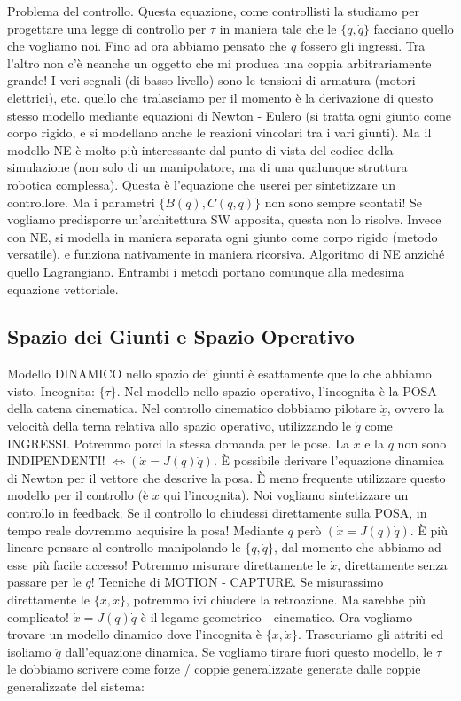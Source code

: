 Problema del controllo. Questa equazione, come controllisti la studiamo per progettare una legge di controllo per $\tau$ in maniera tale che le $\{q,\dot{q}\}$ facciano quello che vogliamo noi. Fino ad ora abbiamo pensato che $\dot{q}$ fossero gli ingressi. Tra l'altro non c'è neanche un oggetto che mi produca una coppia arbitrariamente grande! I veri segnali (di basso livello) sono le tensioni di armatura (motori elettrici), etc. quello che tralasciamo per il momento è la derivazione di questo stesso modello mediante equazioni di Newton - Eulero (si tratta ogni giunto come corpo rigido, e si modellano anche le reazioni vincolari tra i vari giunti). Ma il modello NE è molto più interessante dal punto di vista del codice della simulazione (non solo di un manipolatore, ma di una qualunque struttura robotica complessa). Questa è l'equazione che userei per sintetizzare un controllore. Ma i parametri $\{B(q),C(q,\dot{q})\}$ non sono sempre scontati! Se vogliamo predisporre un'architettura SW apposita, questa non lo risolve. Invece con NE, si modella in maniera separata ogni giunto come corpo rigido (metodo versatile), e funziona nativamente in maniera ricorsiva. Algoritmo di NE anziché quello Lagrangiano. Entrambi i metodi portano comunque alla medesima equazione vettoriale.

\subsection{Spazio dei Giunti e Spazio Operativo}

Modello DINAMICO nello spazio dei giunti è esattamente quello che abbiamo visto. Incognita: $\{\tau\}$. Nel modello nello spazio operativo, l'incognita è la POSA della catena cinematica. Nel controllo cinematico dobbiamo pilotare $\underline{\dot{x}}$, ovvero la velocità della terna relativa allo spazio operativo, utilizzando le $\dot{q}$ come INGRESSI. Potremmo porci la stessa domanda per le pose. La $x$ e la $q$ non sono INDIPENDENTI! $\iff(\dot{x}=J(q)\dot{q})$. \`E possibile derivare l'equazione dinamica di Newton per il vettore che descrive la posa. \`E meno frequente utilizzare questo modello per il controllo (è $x$ qui l'incognita). Noi vogliamo sintetizzare un controllo in feedback. Se il controllo lo chiudessi direttamente sulla POSA, in tempo reale dovremmo acquisire la posa! Mediante $q$ però $(\dot{x}=J(q)\dot{q})$. \`E più lineare pensare al controllo manipolando le $\{q,\dot{q}\}$, dal momento che abbiamo ad esse più facile accesso! Potremmo misurare direttamente le $\dot{x}$, direttamente senza passare per le $q$! Tecniche di \underline{MOTION - CAPTURE}. Se misurassimo direttamente le $\{x,\dot{x}\}$, potremmo ivi chiudere la retroazione. Ma sarebbe più complicato! $\dot{x}=J(q)\dot{q}$ è il legame geometrico - cinematico. Ora vogliamo trovare un modello dinamico dove l'incognita è $\{x,\dot{x}\}$. Trascuriamo gli attriti ed isoliamo $\ddot{q}$ dall'equazione dinamica. Se vogliamo tirare fuori questo modello, le $\tau$ le dobbiamo scrivere come forze / coppie generalizzate generate dalle coppie generalizzate del sistema:

